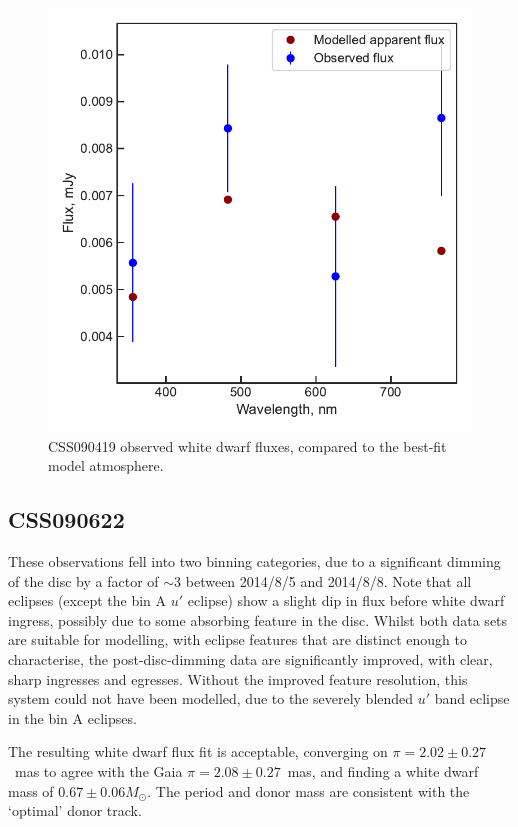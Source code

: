 \begin{figure}
    \centering
    \includegraphics[width=\textwidth]{figures/results/CSS090419/fluxplot.pdf}
    \caption{CSS090419 observed white dwarf fluxes, compared to the best-fit model atmosphere.}
    \label{fig:CSS090419 flux plot}
\end{figure}
\clearpage



\newpage
\subsection{CSS090622}

These observations fell into two binning categories, due to a significant dimming of the disc by a factor of $\sim 3$ between 2014/8/5 and 2014/8/8. Note that all eclipses (except the bin A $u'$ eclipse) show a slight dip in flux before white dwarf ingress, possibly due to some absorbing feature in the disc.
Whilst both data sets are suitable for modelling, with eclipse features that are distinct enough to characterise, the post-disc-dimming data are significantly improved, with clear, sharp ingresses and egresses. Without the improved feature resolution, this system could not have been modelled, due to the severely blended $u'$ band eclipse in the bin A eclipses.

The resulting white dwarf flux fit is acceptable, converging on $\pi = 2.02\pm0.27$~mas to agree with the Gaia $\pi=2.08\pm0.27$~mas, and finding a white dwarf mass of $0.67\pm0.06 M_\odot$. The period and donor mass are consistent with the `optimal' \citet{knigge11} donor track.

